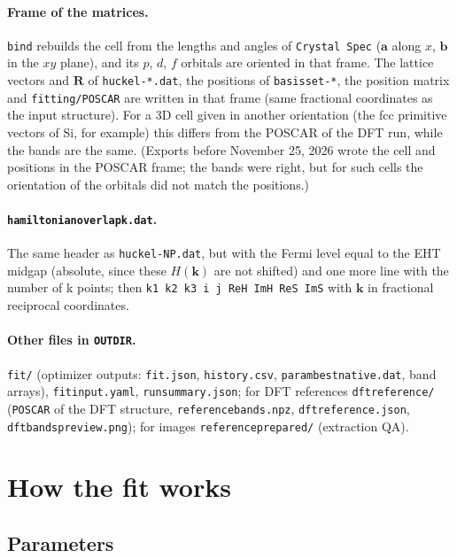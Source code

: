 \documentclass[11pt,a4paper]{article}
\newcommand{\cmd}[1]{\texttt{#1}}
\renewcommand{\_}{\origunderscore\allowbreak}
\begin{document}
\paragraph{Frame of the matrices.} \cmd{bind} rebuilds the cell from the lengths and angles of \cmd{Crystal Spec} ($\mathbf a$ along
$x$, $\mathbf b$ in the $xy$ plane), and its $p$, $d$, $f$ orbitals are oriented in that frame. The lattice vectors and $\mathbf R$
of \cmd{huckel-*.dat}, the positions of \cmd{basis\_set-*}, the position matrix and \cmd{fitting/POSCAR} are written in that frame
(same fractional coordinates as the input structure). For a 3D cell given in another orientation (the fcc primitive vectors of
Si, for example) this differs from the POSCAR of the DFT run, while the bands are the same. (Exports before November 25, 2026
wrote the cell and positions in the POSCAR frame; the bands were right, but for such cells the orientation of the orbitals did
not match the positions.)

\paragraph{\cmd{hamiltonian\_overlap\_k.dat}.} The same header as \cmd{huckel-NP.dat}, but with the Fermi level
equal to the EHT midgap (absolute, since these $H(\mathbf k)$ are not shifted) and one more line with the number of
k points; then \cmd{k1 k2 k3 i j ReH ImH ReS ImS} with $\mathbf k$ in fractional reciprocal coordinates.

\paragraph{Other files in \cmd{OUTDIR}.} \cmd{fit/} (optimizer outputs: \cmd{fit.json}, \cmd{history.csv},
\cmd{param\_best\_native.dat}, band arrays), \cmd{fit\_input.yaml}, \cmd{run\_summary.json}; for DFT references
\cmd{dft\_reference/} (\cmd{POSCAR} of the DFT structure, \cmd{reference\_bands.npz}, \cmd{dft\_reference.json},
\cmd{dft\_bands\_preview.png}); for images \cmd{reference\_prepared/} (extraction QA).

\section{How the fit works}

\subsection{Parameters}
\end{document}
